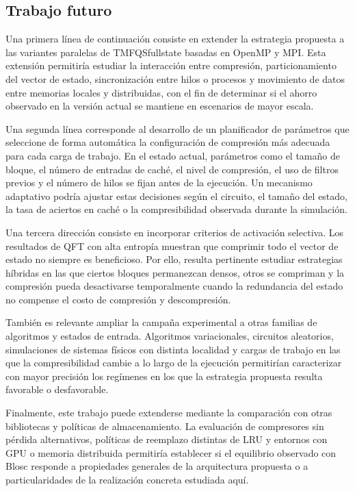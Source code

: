 \subsection{Trabajo futuro}

Una primera línea de continuación consiste en extender la estrategia propuesta a las variantes
paralelas de TMFQSfullstate basadas en OpenMP y MPI. Esta extensión permitiría estudiar la
interacción entre compresión, particionamiento del vector de estado, sincronización entre
hilos o procesos y movimiento de datos entre memorias locales y distribuidas, con el fin de
determinar si el ahorro observado en la versión actual se mantiene en escenarios de mayor
escala.

Una segunda línea corresponde al desarrollo de un planificador de parámetros que seleccione de
forma automática la configuración de compresión más adecuada para cada carga de trabajo. En
el estado actual, parámetros como el tamaño de bloque, el número de entradas de caché, el
nivel de compresión, el uso de filtros previos y el número de hilos se fijan antes de la
ejecución. Un mecanismo adaptativo podría ajustar estas decisiones según el circuito, el
tamaño del estado, la tasa de aciertos en caché o la compresibilidad observada durante la
simulación.

Una tercera dirección consiste en incorporar criterios de activación selectiva. Los resultados
de QFT con alta entropía muestran que comprimir todo el vector de estado no siempre es
beneficioso. Por ello, resulta pertinente estudiar estrategias híbridas en las que ciertos
bloques permanezcan densos, otros se compriman y la compresión pueda desactivarse
temporalmente cuando la redundancia del estado no compense el costo de compresión y
descompresión.

También es relevante ampliar la campaña experimental a otras familias de algoritmos y estados
de entrada. Algoritmos variacionales, circuitos aleatorios, simulaciones de sistemas físicos
con distinta localidad y cargas de trabajo en las que la compresibilidad cambie a lo largo de
la ejecución permitirían caracterizar con mayor precisión los regímenes en los que la
estrategia propuesta resulta favorable o desfavorable.

Finalmente, este trabajo puede extenderse mediante la comparación con otras bibliotecas y
políticas de almacenamiento. La evaluación de compresores sin pérdida alternativos, políticas
de reemplazo distintas de LRU y entornos con GPU o memoria distribuida permitiría establecer
si el equilibrio observado con Blosc responde a propiedades generales de la arquitectura
propuesta o a particularidades de la realización concreta estudiada aquí.
